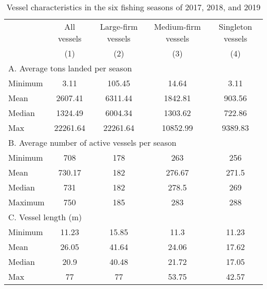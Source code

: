 \begin{table}[tb]
\centering
\caption{Vessel characteristics in the six fishing seasons of 2017, 2018, and 2019} 
\label{vesstats}
\begin{tabular}{lcccc}
   \toprule   & All vessels & Large-firm vessels & Medium-firm vessels & Singleton vessels \\ & (1) & (2) & (3) & (4) \\ 
   \midrule \multicolumn{5}{l}{A. Average tons landed per season} \\ Minimum & 3.11 & 105.45 & 14.64 & 3.11 \\ 
  Mean & 2607.41 & 6311.44 & 1842.81 & 903.56 \\ 
  Median & 1324.49 & 6004.34 & 1303.62 & 722.86 \\ 
  Max & 22261.64 & 22261.64 & 10852.99 & 9389.83 \\ 
   \midrule \multicolumn{5}{l}{B. Average number of active vessels per season} \\ Minimum & 708 & 178 & 263 & 256 \\ 
  Mean & 730.17 & 182 & 276.67 & 271.5 \\ 
  Median & 731 & 182 & 278.5 & 269 \\ 
  Maximum & 750 & 185 & 283 & 288 \\ 
   \midrule \multicolumn{5}{l}{C. Vessel length (m)} \\ Minimum & 11.23 & 15.85 & 11.3 & 11.23 \\ 
  Mean & 26.05 & 41.64 & 24.06 & 17.62 \\ 
  Median & 20.9 & 40.48 & 21.72 & 17.05 \\ 
  Max & 77 & 77 & 53.75 & 42.57 \\ 
   \bottomrule  \end{tabular}
\end{table}
